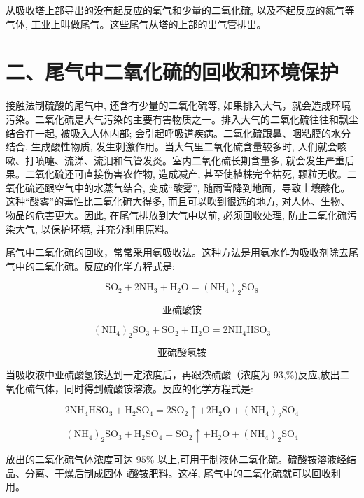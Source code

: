 \documentclass[10pt]{article}
\begin{document}
从吸收塔上部导出的没有起反应的氧气和少量的二氧化硫, 以及不起反应的氮气等气体, 工业上叫做尾气。这些尾气从塔的上部的出气管排出。

\section*{二、尾气中二氧化硫的回收和环境保护}

接触法制硫酸的尾气中, 还含有少量的二氧化硫等, 如果排入大气，就会造成环境污染。二氧化硫是大气污染的主要有害物质之一。排入大气的二氧化硫往往和飘尘结合在一起, 被吸入人体内部; 会引起呼吸道疾病。二氧化硫跟鼻、咽粘膜的水分结合, 生成酸性物质, 发生刺激作用。当大气里二氧化硫含量较多时, 人们就会咳嗽、打喷嚏、流涕、流泪和气管发炎。室内二氧化硫长期含量多, 就会发生严重后果。二氧化硫还可直接伤害农作物, 造成减产, 甚至使植株完全枯死, 颗粒无收。二氧化硫还跟空气中的水蒸气结合, 变成“酸雾”, 随雨雪降到地面，导致土壤酸化。这种“酸雾”的毒性比二氧化硫大得多, 而且可以吹到很远的地方, 对人体、生物、物品的危害更大。因此, 在尾气排放到大气中以前, 必须回收处理, 防止二氧化硫污染大气, 以保护环境, 并充分利用原料。

尾气中二氧化硫的回收，常常采用氨吸收法。这种方法是用氨水作为吸收剂除去尾气中的二氧化硫。反应的化学方程式是:

\[
{\mathrm{{SO}}}_{2} + 2{\mathrm{{NH}}}_{3} + {\mathrm{H}}_{2}\mathrm{O} = {\left( {\mathrm{{NH}}}_{4}\right) }_{2}{\mathrm{{SO}}}_{8}
\]

\[
\text{亚硫酸铵}
\]

\[
{\left( {\mathrm{{NH}}}_{4}\right) }_{2}{\mathrm{{SO}}}_{3} + {\mathrm{{SO}}}_{2} + {\mathrm{H}}_{2}\mathrm{O} = 2{\mathrm{{NH}}}_{4}{\mathrm{{HSO}}}_{3}
\]

\[
\text{亚硫酸氢铵}
\]

当吸收液中亚硫酸氢铵达到一定浓度后，再跟浓硫酸（浓度为 93,\%)反应,放出二氧化硫气体，同时得到硫酸铵溶液。反应的化学方程式是:

\[
2{\mathrm{{NH}}}_{4}{\mathrm{{HSO}}}_{3} + {\mathrm{H}}_{2}{\mathrm{{SO}}}_{4} = 2{\mathrm{{SO}}}_{2} \uparrow + 2{\mathrm{H}}_{2}\mathrm{O} + {\left( {\mathrm{{NH}}}_{4}\right) }_{2}{\mathrm{{SO}}}_{4}
\]

\[
{\left( {\mathrm{{NH}}}_{4}\right) }_{2}{\mathrm{{SO}}}_{3} + {\mathrm{H}}_{2}{\mathrm{{SO}}}_{4} = {\mathrm{{SO}}}_{2} \uparrow + {\mathrm{H}}_{2}\mathrm{O} + {\left( {\mathrm{{NH}}}_{4}\right) }_{2}{\mathrm{{SO}}}_{4}
\]

放出的二氧化硫气体浓度可达 \({95}\%\) 以上,可用于制液体二氧化硫。硫酸铵溶液经结晶、分离、干燥后制成固体 i酸铵肥料。这样, 尾气中的二氧化硫就可以回收利用。
\end{document}
